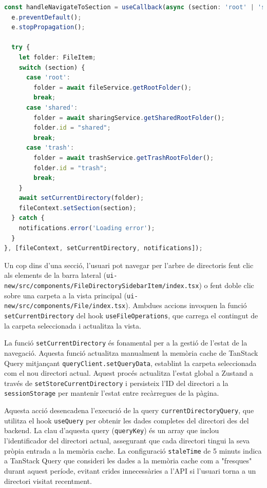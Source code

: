 \begin{lstlisting}[language=typescript, caption={Navegació entre seccions a `FileDirectorySidebar/index.tsx`}]
const handleNavigateToSection = useCallback(async (section: 'root' | 'shared' | 'trash', e: React.MouseEvent) => {
  e.preventDefault();
  e.stopPropagation();

  try {
    let folder: FileItem;
    switch (section) {
      case 'root':
        folder = await fileService.getRootFolder();
        break;
      case 'shared':
        folder = await sharingService.getSharedRootFolder();
        folder.id = "shared";
        break;
      case 'trash':
        folder = await trashService.getTrashRootFolder();
        folder.id = "trash";
        break;
    }
    await setCurrentDirectory(folder);
    fileContext.setSection(section);
  } catch {
    notifications.error('Loading error');
  }
}, [fileContext, setCurrentDirectory, notifications]);
\end{lstlisting}

Un cop dins d'una secció, l'usuari pot navegar per l'arbre de directoris fent clic als elements de la barra lateral (\texttt{ui-new/src/components/FileDirectorySidebarItem/index.tsx}) o fent doble clic sobre una carpeta a la vista principal (\texttt{ui-new/src/components/File/index.tsx}). Ambdues accions invoquen la funció \texttt{setCurrentDirectory} del hook \texttt{useFileOperations}, que carrega el contingut de la carpeta seleccionada i actualitza la vista.

La funció \texttt{setCurrentDirectory} és fonamental per a la gestió de l'estat de la navegació. Aquesta funció actualitza manualment la memòria cache de TanStack Query mitjançant \texttt{queryClient.setQueryData}, establint la carpeta seleccionada com el nou directori actual. Aquest procés actualitza l'estat global a Zustand a través de \texttt{setStoreCurrentDirectory} i persisteix l'ID del directori a la \texttt{sessionStorage} per mantenir l'estat entre recàrregues de la pàgina.

Aquesta acció desencadena l'execució de la query \texttt{currentDirectoryQuery}, que utilitza el hook \texttt{useQuery} per obtenir les dades completes del directori des del backend. La clau d'aquesta query (\texttt{queryKey}) és un array que inclou l'identificador del directori actual, assegurant que cada directori tingui la seva pròpia entrada a la memòria cache. La configuració \texttt{staleTime} de 5 minuts indica a TanStack Query que consideri les dades a la memòria cache com a "fresques" durant aquest període, evitant crides innecessàries a l'API si l'usuari torna a un directori visitat recentment.

